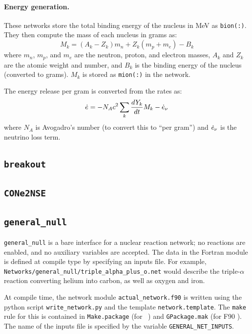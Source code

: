 \paragraph{Energy generation.} These networks store the total binding
energy of the nucleus in MeV as {\tt bion(:)}.  They then compute the
mass of each nucleus in grams as:
\begin{equation}
M_k = (A_k - Z_k) m_n + Z_k (m_p + m_e) - B_k
\end{equation}
where $m_n$, $m_p$, and $m_e$ are the neutron, proton, and electron
masses, $A_k$ and $Z_k$ are the atomic weight and number, and $B_k$
is the binding energy of the nucleus (converted to grams).  $M_k$
is stored as {\tt mion(:)} in the network.

The energy release per gram is converted from the rates as:
\begin{equation}
\dot{e} = -N_A c^2 \sum_k \frac{dY_k}{dt} M_k - \dot{e}_\nu
\end{equation}
where $N_A$ is Avogadro's number (to convert this to ``per gram'')
and $\dot{e}_\nu$ is the neutrino loss term.

\subsection{{\tt breakout}}

\subsection{{\tt CONe2NSE}}

\subsection{{\tt general\_null}}

{\tt general\_null} is a bare interface for a nuclear reaction
network; no reactions are enabled, and no auxiliary variables are
accepted.  The data in the Fortran module is defined at compile type
by specifying an inputs file.  For example, {\tt
  Networks/general\_null/triple\_alpha\_plus\_o.net} would describe
the triple-$\alpha$ reaction converting helium into carbon, as well as
oxygen and iron.

At compile time, the network module {\tt actual\_network.f90}
is written using the python script {\tt write\_network.py}
and the template {\tt network.template}.  The {\tt make} rule
for this is contained in {\tt Make.package} (for \cpp\ \boxlib) and
{\tt GPackage.mak} (for F90 \boxlib).  The name of the inputs file
is specified by the variable {\tt GENERAL\_NET\_INPUTS}.


